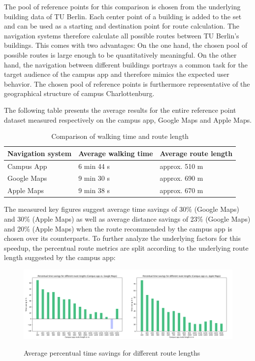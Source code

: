 The pool of reference points for this comparison is chosen from the underlying building data of TU Berlin. Each center point of a building is added to the set and can be used as a starting and destination point for route calculation. The navigation systems therefore calculate all possible routes between TU Berlin's buildings. This comes with two advantages: On the one hand, the chosen pool of possible routes is large enough to be quantitatively meaningful. On the other hand, the navigation between different buildings portrays a common task for the target audience of the campus app and therefore mimics the expected user behavior. The chosen pool of reference points is furthermore representative of the geographical structure of campus Charlottenburg.

The following table presents the average results for the entire reference point dataset measured respectively on the campus app, Google Maps and Apple Maps.

\begin{table}[H]
	\small
	\centering
	\begin{tabular}{|l|l|l|}
		\hline
		\textbf{Navigation system}      & \textbf{Average walking time}       & \textbf{Average route length}  \\
		\hline
        Campus App             & 6 min 44 s	              	& approx. 510 m         \\
		\hline
        Google Maps            & 9 min 30 s              	& approx. 690 m         \\
		\hline
		Apple Maps             & 9 min 38 s              	& approx. 670 m         \\
		\hline
	\end{tabular}
	\caption{Comparison of walking time and route length}
\end{table}

The measured key figures suggest average time savings of 30\% (Google Maps) and 30\% (Apple Maps) as well as average distance savings of 23\% (Google Maps) and 20\% (Apple Maps) when the route recommended by the campus app is chosen over its counterparts. To further analyze the underlying factors for this speedup, the percentual route metrics are split according to the underlying route length suggested by the campus app:

\begin{figure}[H]
	\centering
	\includegraphics[width=1.0\textwidth]{images/time_differences.png}\\
	\caption{Average percentual time savings for different route lengths}
\end{figure}

